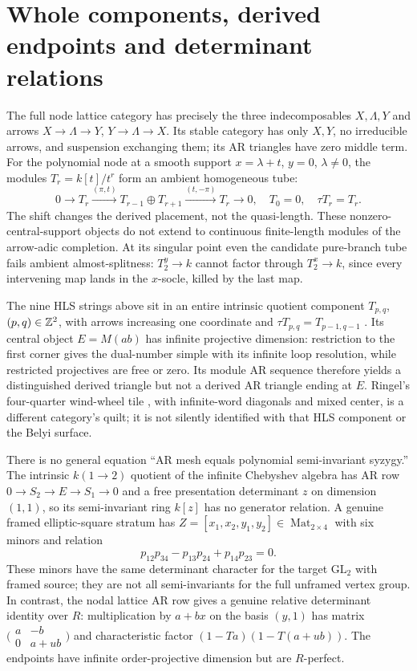 \section{Whole components, derived endpoints and determinant relations}
The full node lattice category has precisely the three indecomposables $X,\Lambda,Y$ and arrows $X\to\Lambda\to Y$, $Y\to\Lambda\to X$. Its stable category has only $X,Y$, no irreducible arrows, and suspension exchanging them; its AR triangles have zero middle term. For the polynomial node at a smooth support $x=\lambda+t$, $y=0$, $\lambda\ne0$, the modules $T_r=k[t]/t^r$ form an ambient homogeneous tube:
\[
 0\longrightarrow T_r\xrightarrow{(\pi,t)}T_{r-1}\oplus T_{r+1}
 \xrightarrow{(t,-\pi)}T_r\longrightarrow0,\quad T_0=0,\quad\tau T_r=T_r.
\]
The shift changes the derived placement, not the quasi-length. These nonzero-central-support objects do not extend to continuous finite-length modules of the arrow-adic completion. At its singular point even the candidate pure-branch tube fails ambient almost-splitness: $T_2^y\to k$ cannot factor through $T_2^x\to k$, since every intervening map lands in the $x$-socle, killed by the last map.

The nine HLS strings above sit in an entire intrinsic quotient component $T_{p,q}$, $(p,q)\in\mathbb Z^2$, with arrows increasing one coordinate and $\tau T_{p,q}=T_{p-1,q-1}$ \cite{HuangLinSu}. Its central object $E=M(ab)$ has infinite projective dimension: restriction to the first corner gives the dual-number simple with its infinite loop resolution, while restricted projectives are free or zero. Its module AR sequence therefore yields a distinguished derived triangle but not a derived AR triangle ending at $E$. Ringel's four-quarter wind-wheel tile \cite{Ringel}, with infinite-word diagonals and mixed center, is a different category's quilt; it is not silently identified with that HLS component or the Belyi surface.

There is no general equation ``AR mesh equals polynomial semi-invariant syzygy.'' The intrinsic $k(1\to2)$ quotient of the infinite Chebyshev algebra has AR row $0\to S_2\to E\to S_1\to0$ and a free presentation determinant $z$ on dimension $(1,1)$, so its semi-invariant ring $k[z]$ has no generator relation. A genuine framed elliptic-square stratum has $Z=[x_1,x_2,y_1,y_2]\in\operatorname{Mat}_{2\times4}$ with six minors and relation
\[
 p_{12}p_{34}-p_{13}p_{24}+p_{14}p_{23}=0.
\]
These minors have the same determinant character for the target $\mathrm{GL}_2$ with framed source; they are not all semi-invariants for the full unframed vertex group. In contrast, the nodal lattice AR row gives a genuine relative determinant identity over $R$: multiplication by $a+bx$ on the basis $(y,1)$ has matrix
$\bigl(\begin{smallmatrix}a&-b\\0&a+ub\end{smallmatrix}\bigr)$ and characteristic factor $(1-Ta)(1-T(a+ub))$. The endpoints have infinite order-projective dimension but are $R$-perfect.

